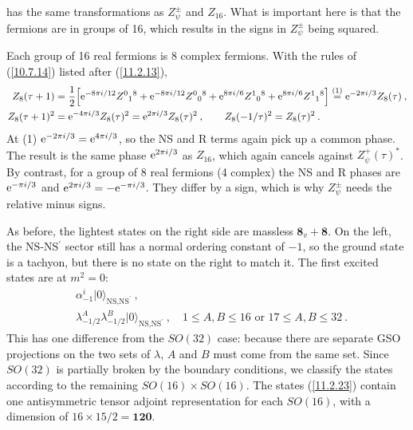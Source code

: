 has the same transformations as $Z_{\psi}^{\pm}$ and $Z_{16}$. What is important here is that the fermions are in groups of 16, which results in the signs in $Z_{\psi}^{\pm}$ being squared.
\begin{tcolorbox}[breakable]
	\begin{remark}
		Each group of 16 real fermions is 8 complex fermions. With the rules of (\ref{10.7.14}) listed after (\ref{11.2.13}),
		\begin{align*}
			Z_{8}(\tau+1)&=\frac{1}{2}\Bigl[\mathrm{e}^{-8\pi i/12}Z^{0}{}_{1}{}^{8}+\mathrm{e}^{-8\pi i/12}Z^{0}{}_{0}{}^{8}+\mathrm{e}^{8\pi i/6}Z^{1}{}_{0}{}^{8}+\mathrm{e}^{8\pi i/6}Z^{1}{}_{1}{}^{8}\Bigr]
			\overset{(1)}{=}\mathrm{e}^{-2\pi i/3}Z_{8}(\tau)\:,\\
			Z_{8}(\tau+1)^{2}&=\mathrm{e}^{-4\pi i/3}Z_{8}(\tau)^{2}=\mathrm{e}^{2\pi i/3}Z_{8}(\tau)^{2}\:,\qquad Z_{8}(-1/\tau)^{2}=Z_{8}(\tau)^{2}\:.
		\end{align*}
		At (1) $\mathrm{e}^{-2\pi i/3}=\mathrm{e}^{4\pi i/3}$, so the NS and R terms again pick up a common phase. The result is the same phase $\mathrm{e}^{2\pi i/3}$ as $Z_{16}$, which again cancels against $Z_{\psi}^{+}(\tau)^{\ast}$. By contrast, for a group of 8 real fermions (4 complex) the NS and R phases are $\mathrm{e}^{-\pi i/3}$ and $\mathrm{e}^{2\pi i/3}=-\mathrm{e}^{-\pi i/3}$. They differ by a sign, which is why $Z_{\psi}^{\pm}$ needs the relative minus signs.
	\end{remark}
\end{tcolorbox}

As before, the lightest states on the right side are massless $\mathbf{8}_{v}+\mathbf{8}$. On the left, the NS-NS$^{\prime}$ sector still has a normal ordering constant of $-1$, so the ground state is a tachyon, but there is no state on the right to match it. The first excited states are at $m^{2}=0$:
\begin{align}
	& \alpha_{-1}^{i}\lvert0\rangle_{\text{NS,NS}^{\prime}} \:, \nonumber \\
	& \lambda^{A}_{-1/2}\lambda^{B}_{-1/2} \lvert0\rangle_{\text{NS,NS}^{\prime}} \:, \quad
	1\leq A,B\leq 16 \text{ or } 17\leq A,B \leq 32 \:. \label{11.2.23}
\end{align}
This has one difference from the $SO(32)$ case: because there are separate GSO projections on the two sets of $\lambda$, $A$ and $B$ must come from the same set. Since $SO(32)$ is partially broken by the boundary conditions, we classify the states according to the remaining $SO(16)\times SO(16)$. The states (\ref{11.2.23}) contain one antisymmetric tensor adjoint representation for each $SO(16)$, with a dimension of $16\times 15/2=\mathbf{120}$.

